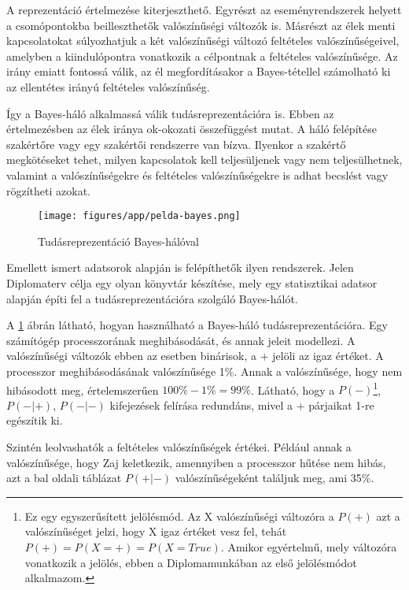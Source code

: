 A reprezentáció értelmezése kiterjeszthető. Egyrészt az eseményrendszerek helyett a csomópontokba beilleszthetők valószínűségi változók is. Másrészt az élek menti kapcsolatokat súlyozhatjuk a két valószínűségi változó feltételes valószínűségeivel, amelyben a kiindulópontra vonatkozik a célpontnak a feltételes valószínűsége. Az irány emiatt fontossá válik, az él megfordításakor a Bayes-tétellel számolható ki az ellentétes irányú feltételes valószínűség.

Így a Bayes-háló alkalmassá válik tudásreprezentációra is. Ebben az értelmezésben az élek iránya ok-okozati összefüggést mutat. A háló felépítése szakértőre vagy egy szakértői rendszerre van bízva. Ilyenkor a szakértő megkötéseket tehet, milyen kapcsolatok kell teljesüljenek vagy nem teljesülhetnek, valamint a valószínűségekre és feltételes valószínűségekre is adhat becslést vagy rögzítheti azokat.

\begin{figure}[htp]
    \centering
    \texttt{[image: figures/app/pelda-bayes.png]}
    \caption{Tudásreprezentáció Bayes-hálóval}
    \label{fig:bayes-halo-tudasrep}
\end{figure}

Emellett ismert adatsorok alapján is felépíthetők ilyen rendszerek. Jelen Diplomaterv célja egy olyan könyvtár készítése, mely egy statisztikai adatsor alapján építi fel a tudásreprezentációra szolgáló Bayes-hálót.

A \ref{fig:bayes-halo-tudasrep} ábrán látható, hogyan használható a Bayes-háló tudásreprezentációra. Egy számítógép processzorának meghibásodását, és annak jeleit modellezi. A valószínűségi változók ebben az esetben binárisok, a + jelöli az igaz értéket. A processzor meghibásodásának valószínűsége 1\%. Annak a valószínűsége, hogy nem hibásodott meg, értelemszerűen $100\%-1\%=99\%$. Látható, hogy a $P(-)$\footnote{Ez egy egyszerűsített jelölésmód. Az X valószínűségi változóra a $P(+)$ azt a valószínűséget jelzi, hogy X igaz értéket vesz fel, tehát $P(+) = P(X=+) = P(X=True)$. Amikor egyértelmű, mely változóra vonatkozik a jelölés, ebben a Diplomamunkában az első jelölésmódot alkalmazom.}, $P(-|+)$, $P(-|-)$ kifejezések felírása redundáns, mivel a $+$ párjaikat 1-re egészítik ki.

Szintén leolvashatók a feltételes valószínűségek értékei. Például annak a valószínűsége, hogy Zaj keletkezik, amennyiben a processzor hűtése nem hibás, azt a bal oldali táblázat $P(+|-)$ valószínűségeként találjuk meg, ami 35\%.

